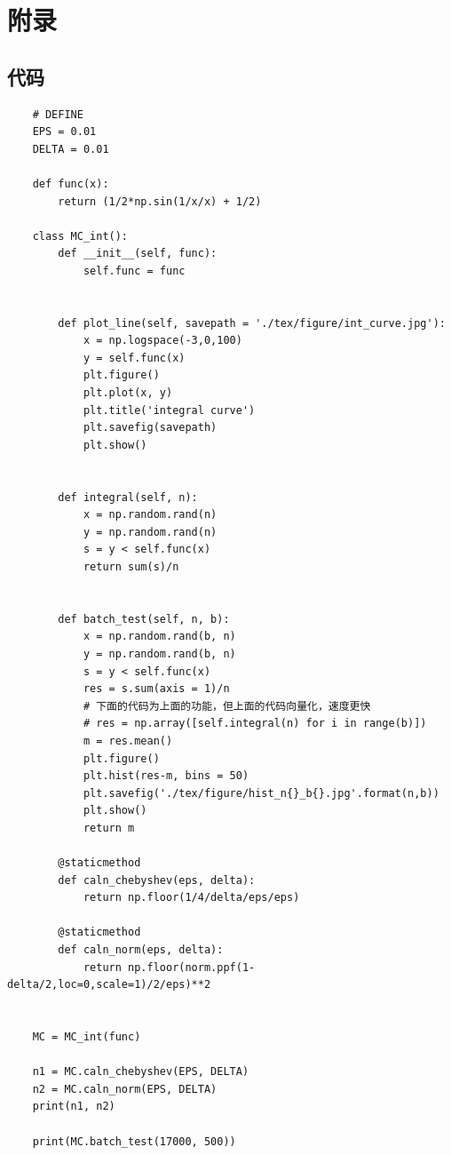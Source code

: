 \documentclass[12pt]{article}
\begin{document}

% 
% 
\newpage
\section*{附录}
\subsection*{代码}

\begin{lstlisting}
    # DEFINE
    EPS = 0.01
    DELTA = 0.01
    
    def func(x):
        return (1/2*np.sin(1/x/x) + 1/2)
    
    class MC_int():
        def __init__(self, func):
            self.func = func
    
    
        def plot_line(self, savepath = './tex/figure/int_curve.jpg'):
            x = np.logspace(-3,0,100)
            y = self.func(x)
            plt.figure()
            plt.plot(x, y)
            plt.title('integral curve')
            plt.savefig(savepath)
            plt.show()
    
    
        def integral(self, n):
            x = np.random.rand(n)
            y = np.random.rand(n)
            s = y < self.func(x)
            return sum(s)/n
    
    
        def batch_test(self, n, b):
            x = np.random.rand(b, n)
            y = np.random.rand(b, n)
            s = y < self.func(x)
            res = s.sum(axis = 1)/n
            # 下面的代码为上面的功能，但上面的代码向量化，速度更快
            # res = np.array([self.integral(n) for i in range(b)])
            m = res.mean()
            plt.figure()
            plt.hist(res-m, bins = 50)
            plt.savefig('./tex/figure/hist_n{}_b{}.jpg'.format(n,b))
            plt.show()
            return m
    
        @staticmethod
        def caln_chebyshev(eps, delta):
            return np.floor(1/4/delta/eps/eps)
    
        @staticmethod
        def caln_norm(eps, delta):
            return np.floor(norm.ppf(1-delta/2,loc=0,scale=1)/2/eps)**2
    
    
    MC = MC_int(func)

    n1 = MC.caln_chebyshev(EPS, DELTA)
    n2 = MC.caln_norm(EPS, DELTA)
    print(n1, n2)

    print(MC.batch_test(17000, 500))
\end{lstlisting}
\end{document}
